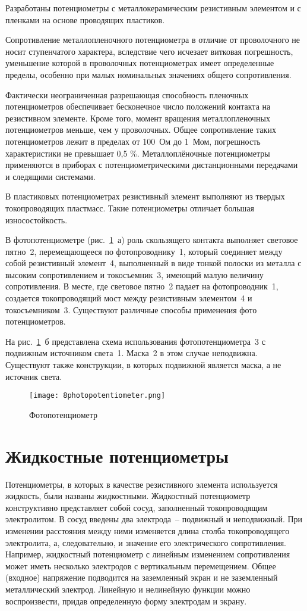 Разработаны потенциометры с металлокерамическим резистивным элементом и с пленками на основе проводящих пластиков.

Сопротивление металлопленочного потенциометра в отличие от проволочного не носит ступенчатого характера, вследствие чего исчезает витковая погрешность, уменьшение которой в проволочных потенциометрах имеет определенные пределы, особенно при малых номинальных значениях общего сопротивления. 

Фактически неограниченная разрешающая способность пленочных потенциометров обеспечивает бесконечное число положений контакта на резистивном элементе. Кроме того, момент вращения металлопленочных потенциометров меньше, чем у проволочных. Общее сопротивление таких потенциометров лежит в пределах от 100~Ом до 1~Мом, погрешность характеристики не превышает 0,5 \%. Металлоплёночные потенциометры применяются в приборах с потенциометрическими дистанционными передачами и следящими системами.

В пластиковых потенциометрах резистивный элемент выполняют из твердых токопроводящих пластмасс. Такие потенциометры отличает большая износостойкость.

В фотопотенциометре (рис.~\ref{pic:8photopotentiometer}~а) роль скользящего контакта выполняет световое пятно~2, перемещающееся по фотопроводнику~1, который соединяет между собой резистивный элемент~4, выполненный в виде тонкой полоски из металла с высоким сопротивлением и токосъемник~3, имеющий малую величину сопротивления. В месте, где световое пятно~2 падает на фотопроводник~1, создается токопроводящий мост между резистивным элементом~4 и токосъемником~3. Существуют различные способы применения фото потенциометров. 

На рис.~\ref{pic:8photopotentiometer}~б представлена схема использования фотопотенциометра~3 с подвижным источником света~1. Маска~2 в этом случае неподвижна. Существуют также конструкции, в которых подвижной является маска, а не источник света.

\begin{figure}[h!]
	\caption{ Фотопотенциометр }
	\texttt{[image: 8photopotentiometer.png]}
	\label{pic:8photopotentiometer}
\end{figure}

\section{Жидкостные потенциометры}

Потенциометры, в которых в качестве резистивного элемента используется жидкость, были названы жидкостными. Жидкостный потенциометр конструктивно представляет собой сосуд, заполненный токопроводящим электролитом. В сосуд введены два электрода~-- подвижный и неподвижный. При изменении расстояния между ними изменяется длина столба токопроводящего электролита, а, следовательно, и значение его электрического сопротивления.
Например, жидкостный потенциометр с линейным изменением сопротивления может иметь несколько электродов с вертикальным перемещением. Общее (входное) напряжение подводится на заземленный экран и не заземленный металлический электрод. Линейную и нелинейную функции можно воспроизвести, придав определенную форму электродам и экрану.

